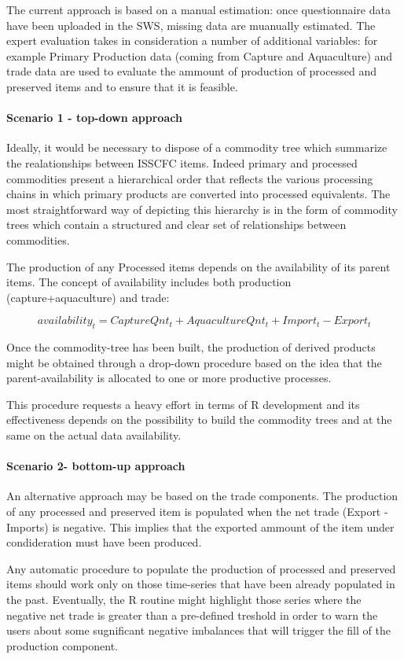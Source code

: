 \documentclass[nojss]{jss}
\begin{document}
The current approach is based on a manual estimation: once questionnaire data have been uploaded in the SWS, missing data are muanually estimated. The expert evaluation takes in consideration a number of additional variables: for example Primary Production data (coming from Capture and Aquaculture) and trade data are used to evaluate the ammount of production of processed and preserved items and to ensure that it is feasible.

\paragraph{Scenario 1 - top-down approach}

Ideally, it would be necessary to dispose of a commodity tree which summarize the realationships between ISSCFC items. Indeed primary and processed commodities present a hierarchical order that reflects the various processing chains in which primary products are converted into processed equivalents. The most straightforward way of depicting this hierarchy is in the form of commodity trees which contain a structured and clear set of relationships between commodities. 

The production of any Processed items depends on the availability of its parent items. The concept of availability includes both production (capture+aquaculture) and trade:

$$
availability_{t}=CaptureQnt_{t}+AquacultureQnt_{t}+Import_{t}-Export_{t}
$$


Once the commodity-tree has been built, the production of derived products might be obtained through a  drop-down procedure based on the idea that the parent-availability is allocated to one or more productive processes.

This procedure requests a heavy effort in terms of R development and its effectiveness depends on the possibility to build the commodity trees and at the same on the actual data availability.


\paragraph{Scenario 2- bottom-up approach}
An alternative approach may be based on the trade components. The production of any processed and preserved item is populated when the net trade (Export - Imports) is negative. This implies that the exported ammount of the item under condideration must have been produced. 

Any automatic procedure to populate the production of processed and preserved items should work only on those time-series that have been already populated in the past. Eventually,  the R routine might highlight those series where the negative net trade is greater than a pre-defined treshold in order to warn the users about some sugnificant negative imbalances that will trigger the fill of the production component.
\end{document}
